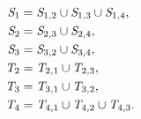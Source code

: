 \begin{equation}
\label{SPS}
\begin{split}
 \mbox{$\emph{S}_{\textit{$1$}}$} & = \mbox{$\emph{S}_{\textit{$1$,$2$}}$}\cup
 \mbox{$\emph{S}_{\textit{$1$,$3$}}$} \cup \mbox{$\emph{S}_{\textit{$1$,$4$}}$},\\
\mbox{$\emph{S}_{\textit{$2$}}$} & =  \mbox{$\emph{S}_{\textit{$2$,$3$}}$} \cup \mbox{$\emph{S}_{\textit{$2$,$4$}}$},\\
\mbox{$\emph{S}_{\textit{$3$}}$} & =  \mbox{$\emph{S}_{\textit{$3$,$2$}}$} \cup \mbox{$\emph{S}_{\textit{$3$,$4$}}$},\\
\mbox{$\emph{T}_{\textit{$2$}}$} & = \mbox{$\emph{T}_{\textit{$2$,$1$}}$} \cup \mbox{$\emph{T}_{\textit{$2$,$3$}}$},\\
\mbox{$\emph{T}_{\textit{$3$}}$} & = \mbox{$\emph{T}_{\textit{$3$,$1$}}$}\cup \mbox{$\emph{T}_{\textit{$3$,$2$}}$},\\
\mbox{$\emph{T}_{\textit{$4$}}$} & = \mbox{$\emph{T}_{\textit{$4$,$1$}}$}\cup \mbox{$\emph{T}_{\textit{$4$,$2$}}$}\cup
\mbox{$\emph{T}_{\textit{$4$,$3$}}$}.
\end{split}
 \end{equation}
